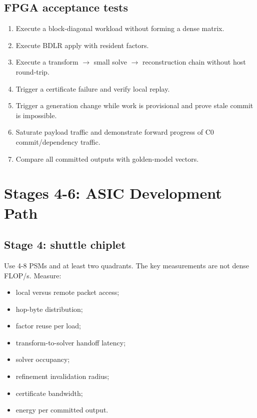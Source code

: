 \documentclass[10pt,letterpaper]{article}
\begin{document}
{{\subsection{FPGA acceptance tests}

\begin{enumerate}
\item Execute a block-diagonal workload without forming a dense matrix.
\item Execute BDLR apply with resident factors.
\item Execute a transform $\rightarrow$ small solve $\rightarrow$ reconstruction chain without host round-trip.
\item Trigger a certificate failure and verify local replay.
\item Trigger a generation change while work is provisional and prove stale commit is impossible.
\item Saturate payload traffic and demonstrate forward progress of C0 commit/dependency traffic.
\item Compare all committed outputs with golden-model vectors.
\end{enumerate}

\section{Stages 4-6: ASIC Development Path}

\subsection{Stage 4: shuttle chiplet}

Use 4-8 PSMs and at least two quadrants. The key measurements are not dense FLOP/s. Measure:

\begin{itemize}
\item local versus remote packet access;
\item hop-byte distribution;
\item factor reuse per load;
\item transform-to-solver handoff latency;
\item solver occupancy;
\item refinement invalidation radius;
\item certificate bandwidth;
\item energy per committed output.
\end{itemize}

}}
\end{document}
